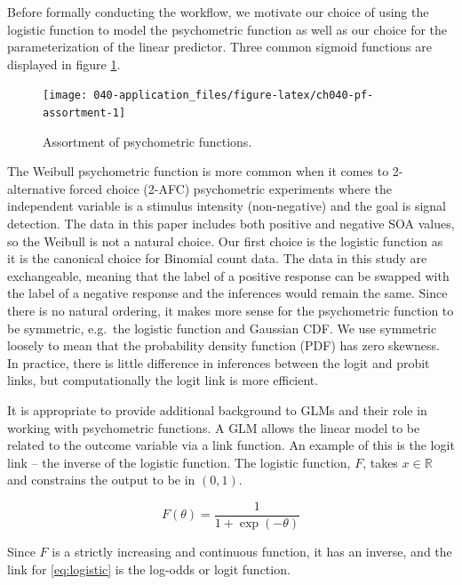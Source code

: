 \documentclass[11pt, oneside, openany]{scrbook}
\begin{document}
Before formally conducting the workflow, we motivate our choice of using the logistic function to model the psychometric function as well as our choice for the parameterization of the linear predictor. Three common sigmoid functions are displayed in figure \ref{fig:ch040-pf-assortment}.

\begin{figure}

{\centering \texttt{[image: 040-application\_files/figure-latex/ch040-pf-assortment-1]} 

}

\caption{Assortment of psychometric functions.}\label{fig:ch040-pf-assortment}
\end{figure}

The Weibull psychometric function is more common when it comes to 2-alternative forced choice (2-AFC) psychometric experiments where the independent variable is a stimulus intensity (non-negative) and the goal is signal detection. The data in this paper includes both positive and negative SOA values, so the Weibull is not a natural choice. Our first choice is the logistic function as it is the canonical choice for Binomial count data. The data in this study are exchangeable, meaning that the label of a positive response can be swapped with the label of a negative response and the inferences would remain the same. Since there is no natural ordering, it makes more sense for the psychometric function to be symmetric, e.g.~the logistic function and Gaussian CDF. We use symmetric loosely to mean that the probability density function (PDF) has zero skewness. In practice, there is little difference in inferences between the logit and probit links, but computationally the logit link is more efficient.

It is appropriate to provide additional background to GLMs and their role in working with psychometric functions. A GLM allows the linear model to be related to the outcome variable via a link function. An example of this is the logit link -- the inverse of the logistic function. The logistic function, \(F\), takes \(x \in \mathbb{R}\) and constrains the output to be in \((0, 1)\).

\begin{equation}
  F(\theta) = \frac{1}{1 + \exp\left(-\theta\right)}
  \label{eq:logistic}
\end{equation}

Since \(F\) is a strictly increasing and continuous function, it has an inverse, and the link for \eqref{eq:logistic} is the log-odds or logit function.
\end{document}
